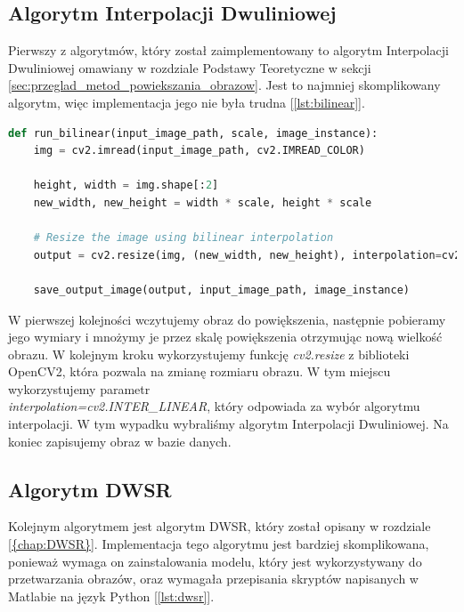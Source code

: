 \subsection*{Algorytm Interpolacji Dwuliniowej}

Pierwszy z algorytmów, który został zaimplementowany to algorytm Interpolacji Dwuliniowej omawiany w rozdziale Podstawy Teoretyczne w sekcji \ref{sec:przeglad_metod_powiekszania_obrazow}.
Jest to najmniej skomplikowany algorytm, więc implementacja jego nie była trudna [\ref{lst:bilinear}].

\begin{lstlisting}[language=Python, caption=Implementacja algorytmu Bilinear., label={lst:bilinear}]
def run_bilinear(input_image_path, scale, image_instance):
    img = cv2.imread(input_image_path, cv2.IMREAD_COLOR)
    
    height, width = img.shape[:2]
    new_width, new_height = width * scale, height * scale

    # Resize the image using bilinear interpolation
    output = cv2.resize(img, (new_width, new_height), interpolation=cv2.INTER_LINEAR)

    save_output_image(output, input_image_path, image_instance)
\end{lstlisting}

W pierwszej kolejności wczytujemy obraz do powiększenia, następnie pobieramy jego wymiary i mnożymy je przez skalę powiększenia otrzymując nową wielkość obrazu. W kolejnym kroku wykorzystujemy funkcję \textit{cv2.resize} z biblioteki OpenCV2, która pozwala na zmianę rozmiaru obrazu. W tym miejscu wykorzystujemy parametr \\ \textit{interpolation=cv2.INTER\_LINEAR}, który odpowiada za wybór algorytmu interpolacji. W tym wypadku wybraliśmy algorytm Interpolacji Dwuliniowej. Na koniec zapisujemy obraz w bazie danych.


\subsection*{Algorytm DWSR}

Kolejnym algorytmem jest algorytm DWSR, który został opisany w rozdziale \ref{{chap:DWSR}}.
Implementacja tego algorytmu jest bardziej skomplikowana, ponieważ wymaga on zainstalowania modelu, który jest wykorzystywany do przetwarzania obrazów, oraz wymagała przepisania skryptów napisanych w Matlabie na język Python [\ref{lst:dwsr}].


